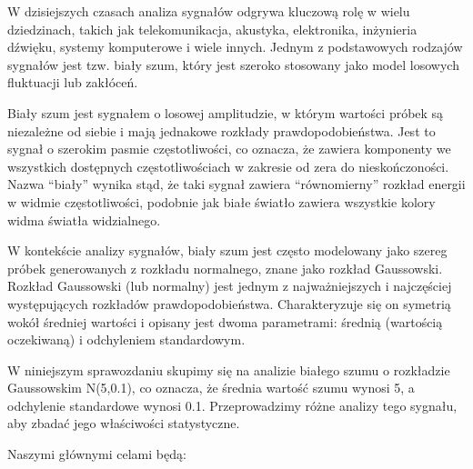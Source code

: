 \documentclass[11pt]{article}
\begin{document}
W dzisiejszych czasach analiza sygnałów odgrywa kluczową rolę w wielu
dziedzinach, takich jak telekomunikacja, akustyka, elektronika,
inżynieria dźwięku, systemy komputerowe i wiele innych. Jednym z
podstawowych rodzajów sygnałów jest tzw. biały szum, który jest szeroko
stosowany jako model losowych fluktuacji lub zakłóceń.

Biały szum jest sygnałem o losowej amplitudzie, w którym wartości próbek
są niezależne od siebie i mają jednakowe rozkłady prawdopodobieństwa.
Jest to sygnał o szerokim pasmie częstotliwości, co oznacza, że zawiera
komponenty we wszystkich dostępnych częstotliwościach w zakresie od zera
do nieskończoności. Nazwa ``biały'' wynika stąd, że taki sygnał zawiera
``równomierny'' rozkład energii w widmie częstotliwości, podobnie jak
białe światło zawiera wszystkie kolory widma światła widzialnego.

W kontekście analizy sygnałów, biały szum jest często modelowany jako
szereg próbek generowanych z rozkładu normalnego, znane jako rozkład
Gaussowski. Rozkład Gaussowski (lub normalny) jest jednym z
najważniejszych i najczęściej występujących rozkładów
prawdopodobieństwa. Charakteryzuje się on symetrią wokół średniej
wartości i opisany jest dwoma parametrami: średnią (wartością
oczekiwaną) i odchyleniem standardowym.

W niniejszym sprawozdaniu skupimy się na analizie białego szumu o
rozkładzie Gaussowskim N(5,0.1), co oznacza, że średnia wartość szumu
wynosi 5, a odchylenie standardowe wynosi 0.1. Przeprowadzimy różne
analizy tego sygnału, aby zbadać jego właściwości statystyczne.

Naszymi głównymi celami będą:
\end{document}
